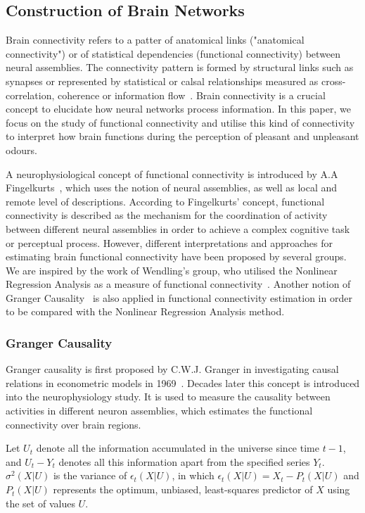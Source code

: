 \documentclass[conference]{IEEEtran}
\begin{document}
\subsection{Construction of Brain Networks}
Brain connectivity refers to a patter of anatomical links ("anatomical connectivity") or of statistical dependencies (functional connectivity) between neural assemblies. The connectivity pattern is formed by structural links such as synapses or represented by statistical or calsal relationships measured as cross-correlation, coherence or information flow~\cite{sporns2007brain}. Brain connectivity is a crucial concept to elucidate how neural networks process information. In this paper, we focus on the study of functional connectivity and utilise this kind of connectivity to interpret how brain functions during the perception of pleasant and unpleasant odours. 

A neurophysiological concept of functional connectivity is introduced by A.A Fingelkurts~\cite{fingelkurts2005functional}, which uses the notion of neural assemblies, as well as local and remote level of descriptions. According to Fingelkurts' concept, functional connectivity is described as the mechanism for the coordination of activity between different neural assemblies in order to achieve a complex cognitive task or perceptual process. However, different interpretations and approaches for estimating brain functional connectivity have been proposed by several groups. We are inspired by the work of Wendling's group, who utilised the Nonlinear Regression Analysis as a measure of functional connectivity~\cite{bettus2008enhanced}. Another notion of Granger Causality~\cite{roebroeck2005mapping} is also applied in functional connectivity estimation in order to be compared with the Nonlinear Regression Analysis method. 
\subsubsection{Granger Causality}
Granger causality is first proposed by C.W.J. Granger in investigating causal relations in econometric models in 1969~\cite{granger1969investigating}. Decades later this concept is introduced into the neurophysiology study. It is used to measure the causality between activities in different neuron assemblies, which estimates the functional connectivity over brain regions. 

Let $U_t$ denote all the information accumulated in the universe since time $t-1$, and $U_t-Y_t$ denotes all this information apart from the specified series $Y_t$. $\sigma^2(X|U)$ is the variance of $\epsilon_t(X|U)$, in which $\epsilon_t(X|U)=X_t-P_t(X|U)$ and $P_t(X|U)$ represents the optimum, unbiased, least-squares predictor of $X$ using the set of values $U$.
\end{document}
